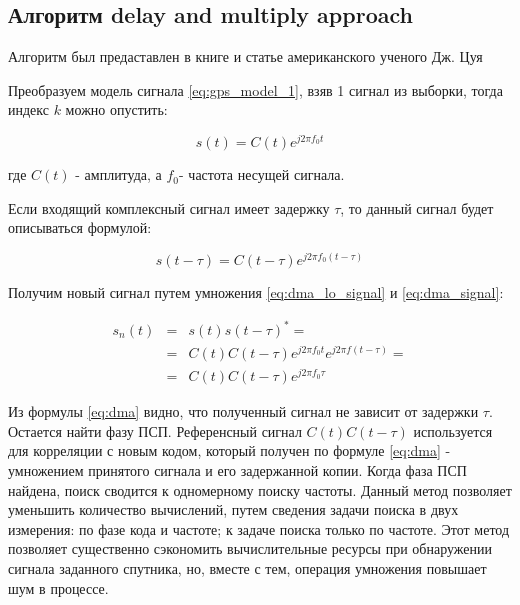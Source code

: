 \subsection{Алгоритм delay and multiply approach}
\label{ssec:dma}

Алгоритм был предаставлен в книге и статье американского ученого Дж.
Цуя \cite{lin_dma, tsui}

Преобразуем модель сигнала \ref{eq:gps_model_1}, взяв 1 сигнал из выборки, тогда индекс $k$ можно опустить:
\begin{center}
\begin{equation}
	\label{eq:dma_lo_signal}
	s(t)=C(t)e^{j2{\pi}f_{0}t}
\end{equation}
\end{center}
где $C(t)$ - амплитуда, а $f_{0}$- частота несущей сигнала.

Если входящий комплексный сигнал имеет задержку $\tau$, то данный
сигнал будет описываться формулой: 

\begin{center}
\begin{equation}
	\label{eq:dma_signal}
	s(t-\tau)=C(t-\tau)e^{j2{\pi}f_{0}(t-\tau)}
\end{equation}
\end{center}

Получим новый сигнал путем умножения \ref{eq:dma_lo_signal} и \ref{eq:dma_signal}:

\begin{center}
\begin{eqnarray}
	s_{n}(t) & = & s(t)s(t-\tau)^{*}=\nonumber \\
	 & = & C(t)C(t-\tau)e^{j2\pi f_{0}t}e^{j2\pi f(t-\tau)}=\label{eq:dma}\\
	 & = & C(t)C(t-\tau)e^{j2\pi f_{0}\tau}\nonumber 
\end{eqnarray}

\par\end{center}

Из формулы \ref{eq:dma} видно, что полученный сигнал не зависит от
задержки $\tau$. Остается найти фазу ПСП. Референсный сигнал
$C(t)C(t-\tau)$ используется для корреляции с новым кодом, который
получен по формуле \ref{eq:dma} - умножением принятого сигнала и его задержанной
копии. Когда фаза ПСП найдена, поиск сводится к одномерному поиску
частоты. Данный метод позволяет уменьшить количество вычислений, путем
сведения задачи поиска в двух измерения: по фазе кода и частоте; к
задаче поиска только по частоте. Этот метод позволяет существенно
сэкономить вычислительные ресурсы при обнаружении сигнала заданного
спутника, но, вместе с тем, операция умножения повышает шум в процессе.

